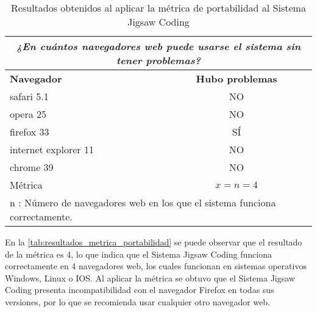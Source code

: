\begin{longtable}{lc}
	\caption{Resultados obtenidos al aplicar la métrica de portabilidad al Sistema Jigsaw Coding}
	\label{tab:resultados_metrica_portabilidad}\\
	\toprule[0.7mm]
	\multicolumn{2}{c}{\emph{¿En cuántos navegadores web puede usarse el sistema sin tener problemas?}}\\
	\midrule
	\textbf{Navegador} & \textbf{Hubo problemas} \\
	\midrule
	safari 5.1 &  NO \\
	opera 25 & NO \\
	firefox 33 & SÍ \\
	internet explorer 11 & NO \\
	chrome 39 & NO \\
	\midrule
	Métrica & $x = n = 4$		\\
	\multicolumn{2}{l}{n : Número de navegadores web en los que el sistema funciona correctamente.}\\
	\bottomrule[0.7mm]
\end{longtable}

En la \autoref{tab:resultados_metrica_portabilidad} se puede observar que el resultado de la métrica es 4, lo que indica que el Sistema Jigsaw Coding funciona correctamente en 4 navegadores web, los cuales funcionan en sistemas operativos Windows, Linux o IOS. Al aplicar la métrica se obtuvo que el Sistema Jigsaw Coding presenta incompatibilidad con el navegador Firefox en todas sus versiones, por lo que se recomienda usar cualquier otro navegador web.